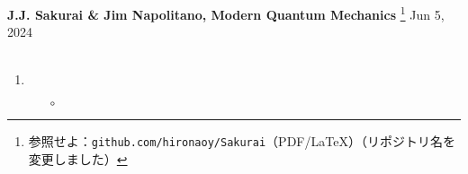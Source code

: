 \documentclass{jarticle}
\begin{document}
\noindent
\textbf{J.J. Sakurai \& Jim Napolitano, Modern Quantum Mechanics}
\footnote{
参照せよ：\texttt{github.com/hironaoy/Sakurai}（PDF/\LaTeX）（リポジトリ名を変更しました）
}
\hfill Jun 5, 2024\vspace{-2mm} \\
\hrulefill \\

\noindent
\begin{enumerate}
\item \textgt{}

  \begin{itemize}
  \item [$\circ$] 
  \end{itemize}
\end{enumerate}
\end{document}
